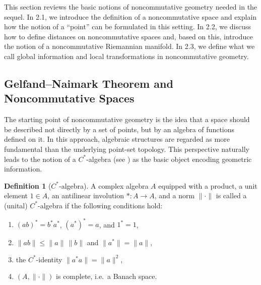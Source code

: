 \documentclass[12pt]{article}
\theoremstyle{definition} %
\newtheorem{definition}{Definition}
\theoremstyle{plain} %
\theoremstyle{remark} %
\theoremstyle{underline}
\begin{document}
This section reviews the basic notions of noncommutative geometry needed in the sequel.
In 2.1, we introduce the definition of a noncommutative space and explain how the notion of a ``point'' can be formulated in this setting.
In 2.2, we discuss how to define distances on noncommutative spaces and, based on this, introduce the notion of a noncommutative Riemannian manifold.
In 2.3, we define what we call global information and local transformations in noncommutative geometry.




\subsection{Gelfand--Naimark Theorem and Noncommutative Spaces}

The starting point of noncommutative geometry is the idea that a space should be described not directly by a set of points, but by an algebra of functions defined on it. In this approach, algebraic structures are regarded as more fundamental than the underlying point-set topology. This perspective naturally leads to the notion of a $C^*$-algebra (see \cite{Landi:1997sh}) as the basic object encoding geometric information.

\begin{definition}[{$C^*$-algebra}]
    A complex algebra $A$ equipped with a product, a unit element $1\in A$, an antilinear involution $*:A\to A$, and a norm $\|\cdot\|$ is called a (unital) $C^*$-algebra if the following conditions hold:
    \begin{enumerate}
        \item $(ab)^* = b^* a^*$, $(a^*)^* = a$, and $1^* = 1$,
        \item $\|ab\| \le \|a\|\,\|b\|$ and $\|a^*\| = \|a\|$,
        \item the $C^*$-identity $\|a^*a\| = \|a\|^2$,
        \item $(A,\|\cdot\|)$ is complete, i.e.\ a Banach space.
    \end{enumerate}
\end{definition}
\end{document}

